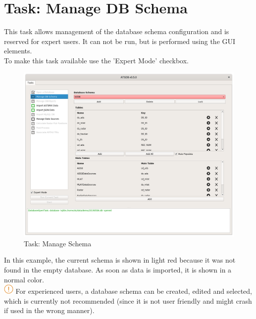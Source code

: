 \section{Task: Manage DB Schema}
\label{sec:task_manage_db_schema}

This task allows management of the database schema configuration and is reserved for expert users. It can not be run, but is performed using the GUI elements. \\

To make this task available use the 'Expert Mode' checkbox.

\begin{figure}[H]
  \hspace*{-2.5cm}
    \includegraphics[width=19cm]{../screenshots/task_manage_schema.png}
  \caption{Task: Manage Schema}
\end{figure}

In this example, the current schema is shown in light red because it was not found in the empty database. As soon as data is imported, it is shown in a normal color. \\

\includegraphics[width=0.5cm]{../../data/icons/hint.png} For experienced users, a database schema can be created, edited and selected, which is currently not recommended (since it is not user friendly and might crash if used in the wrong manner).
